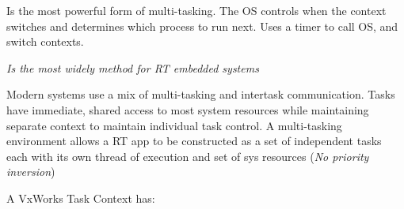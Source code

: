 \documentclass[a4paper,11pt]{article}
\begin{document}



Is the most powerful form of multi-tasking. The OS controls when the context switches and determines which process to run next. Uses a timer to call OS, and switch contexts.\par



\emph{Is the most widely method for RT embedded systems}\par






Modern systems use a mix of multi-tasking and intertask communication. Tasks have immediate, shared access to most system resources while maintaining separate context to maintain individual task control. A multi-tasking environment allows a RT app to be constructed as a set of independent tasks each with its own thread of execution and set of sys resources (\emph{No priority inversion})\par



\Needspace{135pt}
A VxWorks Task Context has:\par
\end{document}

